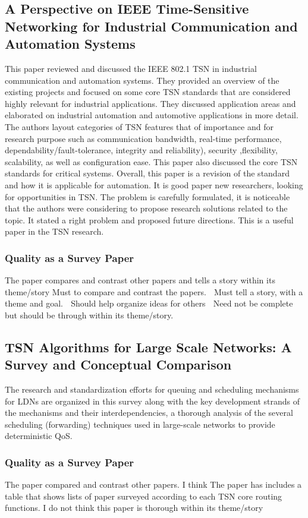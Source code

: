 \documentclass{article}
\begin{document}
\subsection{A Perspective on IEEE
Time-Sensitive Networking
for Industrial Communication
and Automation Systems}
This paper \cite{bello2019perspective} reviewed and discussed the IEEE
802.1 TSN in industrial communication and automation
systems. They provided an overview of the existing projects
and focused on some
core TSN standards that are  considered highly relevant for
industrial applications. They discussed application areas and elaborated on industrial automation and
automotive applications in more detail. 
The authors layout categories of TSN features that of importance and for research purpose such as  communication bandwidth, real-time performance, dependability/fault-tolerance, integrity and reliability), security ,flexibility, scalability, as well as configuration ease.  This paper also discussed the core TSN standards for critical systems. Overall, this paper is a revision of the standard and how it is applicable for automation. It is good paper new researchers, looking for opportunities in TSN.
The problem is carefully formulated, it is noticeable that the authors were considering to propose research solutions related to the topic. It stated a right problem and proposed future directions. This is a useful paper in the TSN research.
\subsubsection{Quality as a Survey Paper}
The paper compares and contrast other papers and tells a story within its theme/story
Must to compare and contrast the papers.
 Must tell a story, with a theme and goal. 
 Should help organize ideas for others
 Need not be complete but should be through within its 
theme/story.

\subsection{TSN Algorithms for Large Scale Networks: A
Survey and Conceptual Comparison }
The research and standardization efforts for queuing and scheduling mechanisms for LDNs are organized in this survey \cite{nasrallah2019tsn} along with the key development strands of the mechanisms and their interdependencies, a thorough analysis of the several scheduling (forwarding) techniques used in large-scale networks to provide deterministic QoS. 
\subsubsection{Quality as a Survey Paper}
The paper compared and contrast other papers. I think
The paper has includes a table that shows lists of paper surveyed according to each TSN core routing functions. 
I do not think this paper is thorough within its theme/story
\end{document}
